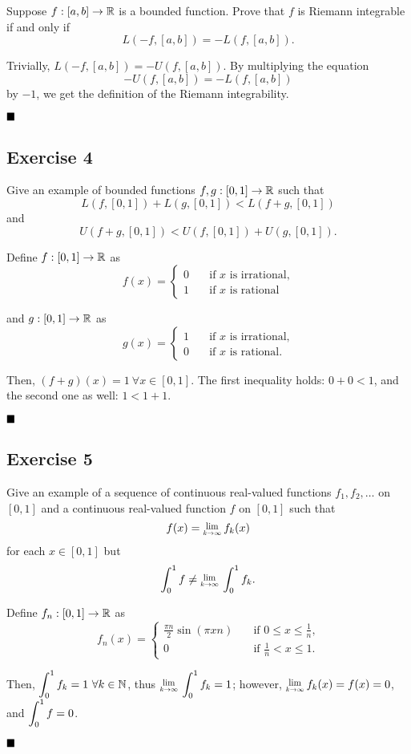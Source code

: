 \begin{formulationBox}
	Suppose $f:[a,b]\rightarrow\mathbb{R}$ is a bounded function. Prove that $f$ is Riemann integrable if and only if \[L(-f, [a,b]) = -L(f, [a,b]).\]
\end{formulationBox}

Trivially, $L(-f, [a,b]) = -U(f, [a,b])$. By multiplying the equation \[-U(f,[a,b]) = -L(f,[a,b])\] by $-1$, we get the definition of the Riemann integrability.

$\qed$

\subsection{Exercise 4}

\begin{formulationBox}
	Give an example of bounded functions $f, g:[0,1]\rightarrow\mathbb{R}$ such that \[L(f, [0,1]) + L(g, [0,1]) < L(f+g,[0,1])\] and \[U(f+g,[0,1]) < U(f, [0,1]) + U(g, [0,1]).\]
\end{formulationBox}

Define $f:[0,1]\rightarrow\mathbb{R}$ as
\[
	f(x) =
	\begin{cases}
		0 &\quad \textrm{if $x$ is irrational,}\\
		1 &\quad \textrm{if $x$ is rational}
	\end{cases}
\]

and $g:[0,1]\rightarrow\mathbb{R}$ as
\[
	g(x) =
	\begin{cases}
		1 &\quad \textrm{if $x$ is irrational,}\\
		0 &\quad \textrm{if $x$ is rational.}
	\end{cases}
\]

Then, $(f+g)(x) = 1\ \forall x\in[0,1]$. The first inequality holds: $0 + 0 < 1$, and the second one as well: $1 < 1 + 1$.

$\qed$

\subsection{Exercise 5}

\begin{formulationBox}
	Give an example of a sequence of continuous real-valued functions $f_1, f_2, \dots$ on $[0,1]$ and a continuous real-valued function $f$ on $[0,1]$ such that \[f(x)=\Lim{k\rightarrow\infty}f_k(x)\] for each $x\in[0,1]$ but \[\Int{0}{1}f \neq \Lim{k\rightarrow\infty}\Int{0}{1}f_k.\]
\end{formulationBox}

Define $f_n:[0,1]\rightarrow\mathbb{R}$ as
\[
	f_n(x) =
	\begin{cases}
		\frac{\pi n}{2}\sin(\pi xn) &\quad \textrm{if $0\leq x\leq \frac{1}{n}$,}\\
		0 &\quad \textrm{if $\frac{1}{n} < x \leq 1$.}
	\end{cases}
\]

Then, $\displaystyle \int_{0}^{1}f_k = 1\ \forall k\in\mathbb{N}$, thus $\Lim{k\rightarrow\infty}\Int{0}{1}f_k = 1$; however, $\Lim{k\rightarrow\infty}f_k(x) = f(x) = 0$, and $\displaystyle \int_{0}^{1}f = 0$.

$\qed$

